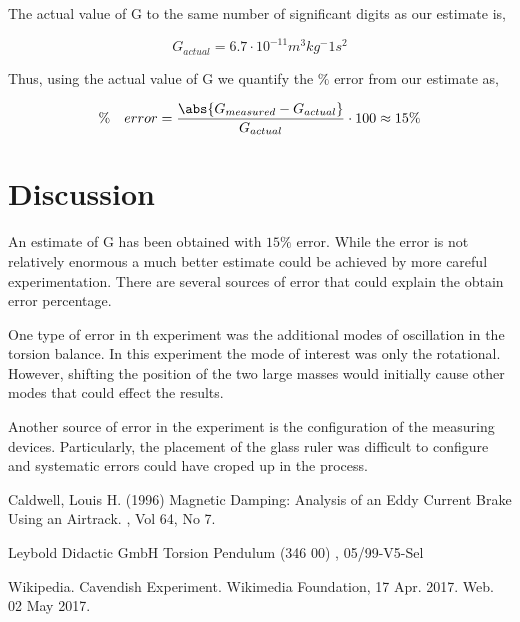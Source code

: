\documentclass[twoside,twocolumn]{article}
\begin{document}
The actual value of G to the same number of significant digits as our estimate is,

\begin{equation}
\label{eq:actual_g}
  G_{actual} = 6.7 \cdot 10^{-11} m^3kg^-1s^2
\end{equation}

Thus, using the actual value of G we quantify the $\%$ error from our estimate as,

$$
 \% \quad error = \frac{\abs{G_{measured} - G_{actual}}}{G_{actual}} \cdot 100 \approx 15\%
$$


\section{Discussion}

An estimate of G has been obtained with $15\%$ error. While the error is not relatively enormous a much better
estimate could be achieved by more careful experimentation. There are several sources of error that could explain
the obtain error percentage.

One type of error in th experiment was the additional modes of oscillation in the torsion balance. In this experiment
the mode of interest was only the rotational. However, shifting the position of the two large masses would initially
cause other modes that could effect the results.

Another source of error in the experiment is the configuration of the measuring devices. Particularly, the placement of the
glass ruler was difficult to configure and systematic errors could have croped up in the process.



\begin{thebibliography}{99} %

Caldwell, Louis H. (1996)
\newblock Magnetic Damping: Analysis of an Eddy Current Brake Using an Airtrack.
, Vol 64, No 7.


Leybold Didactic GmbH
\newblock Torsion Pendulum (346 00)
, 05/99-V5-Sel

Wikipedia.
\newblock Cavendish Experiment.
\newblock Wikimedia Foundation, 17 Apr. 2017. Web. 02 May 2017.

\end{thebibliography}

\end{document}
